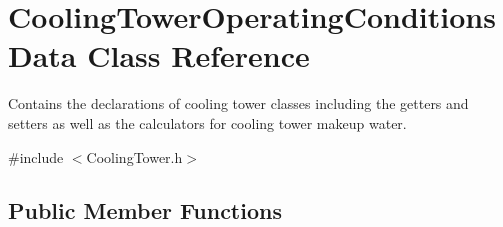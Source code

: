 \hypertarget{class_cooling_tower_operating_conditions_data}{}\section{Cooling\+Tower\+Operating\+Conditions\+Data Class Reference}
\label{class_cooling_tower_operating_conditions_data}


Contains the declarations of cooling tower classes including the getters and setters as well as the calculators for cooling tower makeup water.  




{\ttfamily \#include $<$Cooling\+Tower.\+h$>$}

\subsection*{Public Member Functions}
